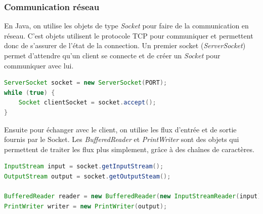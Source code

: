 \subsubsection{Communication réseau}
En Java, on utilise les objets de type \emph{Socket} pour faire de la communication en réseau. C'est objets utilisent le protocole TCP pour communiquer et permettent donc de s'assurer de l'état de la connection.
Un premier socket (\emph{ServerSocket}) permet d'attendre qu'un client se connecte et de créer un \emph{Socket} pour communiquer avec lui.
\begin{lstlisting}[language=Java]
ServerSocket socket = new ServerSocket(PORT);
while (true) {
	Socket clientSocket = socket.accept();
}
\end{lstlisting}

Ensuite pour échanger avec le client, on utilise les flux d'entrée et de sortie fournis par le Socket.
Les \emph{BufferedReader} et \emph{PrintWriter} sont des objets qui permettent de traiter les flux plus simplement, grâce à des chaînes de caractères.

\begin{lstlisting}[language=Java]
InputStream input = socket.getInputStream();
OutputStream output = socket.getOutputSteam();

BufferedReader reader = new BufferedReader(new InputStreamReader(input));
PrintWriter writer = new PrintWriter(output);
\end{lstlisting}

